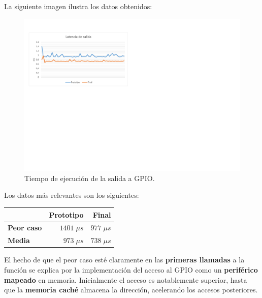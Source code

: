 La siguiente imagen ilustra los datos obtenidos:

\smallskip

\begin{figure}[H]
	\noindent \begin{centering}
		\includegraphics[width=\linewidth*3/4]{capitulo6/lat_gpio}
		\par\end{centering}
	\smallskip
	\caption{\label{fig:lat_gpio} Tiempo de ejecución de la salida a GPIO.}
\end{figure}

\smallskip

Los datos más relevantes son los siguientes:

\smallskip

\begin{center}
	\begin{tabular}{|l|r|r|}
		\hline & \textbf{Prototipo} & \textbf{Final} \\ 
		\hline \textbf{Peor caso} & $1401 \; \mu s$ & $977 \; \mu s$ \\
		\hline \textbf{Media} & $973 \; \mu s$ & $738 \; \mu s$ \\
		\hline
	\end{tabular}
	\smallskip
\end{center}

\smallskip

El hecho de que el peor caso esté claramente en las \textbf{primeras llamadas} a la función se explica por la implementación del acceso al \acrshort{GPIO} como un \textbf{periférico mapeado} en memoria. Inicialmente el acceso es notablemente superior, hasta que la \textbf{memoria caché} almacena la dirección, acelerando los accesos posteriores.

